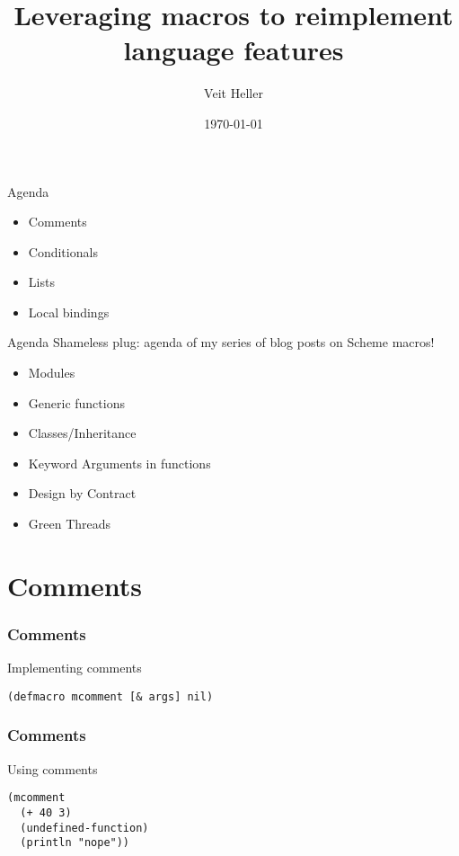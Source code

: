 \documentclass[aspectratio=169]{beamer}
\title{Leveraging macros to reimplement language features}
\date{\today}
\author{Veit Heller}
\institute{Clojure Meetup Berlin}
\begin{document}
  \maketitle
  \begin{frame}{Agenda}
    \begin{itemize}
      \item Comments
      \item Conditionals
      \item Lists
      \item Local bindings
    \end{itemize}
  \end{frame}
  \begin{frame}{Agenda}
    Shameless plug: agenda of my series of blog posts on Scheme macros!
    \begin{itemize}
      \item Modules
      \item Generic functions
      \item Classes/Inheritance
      \item Keyword Arguments in functions
      \item Design by Contract
      \item Green Threads
    \end{itemize}
  \end{frame}
  \section{Comments}
  \begin{frame}[fragile]
    \frametitle{Comments}
    \begin{listing}[H]
      \caption{Implementing comments}
      \begin{verbatim}
(defmacro mcomment [& args] nil)
      \end{verbatim}
    \end{listing}
  \end{frame}
  \begin{frame}[fragile]
    \frametitle{Comments}
    \begin{listing}[H]
      \caption{Using comments}
      \begin{verbatim}
(mcomment
  (+ 40 3)
  (undefined-function)
  (println "nope"))
      \end{verbatim}
    \end{listing}
  \end{frame}
\end{document}
